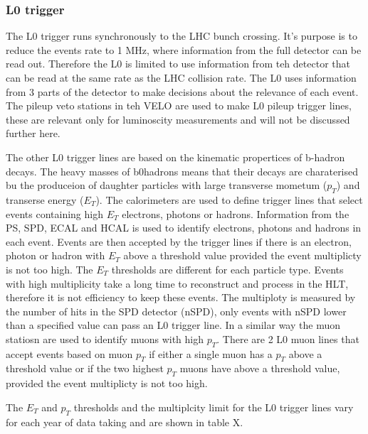 \subsubsection{L0 trigger}
\label{L0}


The L0 trigger runs synchronously to the LHC bunch crossing. It's purpose is to reduce the events rate to 1 MHz, where information from the full detector can be read out. Therefore the L0 is limited to use information from teh detector that can be read at the same rate as the LHC collision rate.
The L0 uses information from 3 parts of the detector to make decisions about the relevance of each event. The pileup veto stations in teh VELO are used to make L0 pileup trigger lines, these are relevant only for luminoscity measurements and will not be discussed further here.

The other L0 trigger lines are based on the kinematic propertices of b-hadron decays. The heavy masses of b0hadrons means that their decays are charaterised bu the produceion of daughter particles with large transverse mometum ($p_{T}$) and transerse energy ($E_{T}$).
The calorimeters are used to define trigger lines that select events containing high $E_{T}$ electrons, photons or hadrons. Information from the PS, SPD, ECAL and HCAL is used to identify electrons, photons and hadrons in each event. Events are then accepted by the trigger lines if there is an  electron, photon or hadron with $E_{T}$ above a threshold value provided the event multiplicty is not too high. The $E_{T}$ thresholds are different for each particle type. Events with high multiplicity take a long time to reconstruct and process in the HLT, therefore it is not efficiency to keep these events. The multiploty is measured by the number of hits in the SPD detector (nSPD), only events with nSPD lower than a specified value can pass an L0 trigger line. 
In a similar way the muon statiosn are used to identify muons with high $p_{T}$. There are 2 L0 muon lines that accept events based on muon $p_{T}$ if either a single muon has a $p_{T}$  above a threshold value or if the two highest $p_{T}$  muons have above a threshold value, provided the event multiplicty is not too high. %

The  $E_{T}$ and $p_{T}$ thresholds and the multiplcity limit for the L0 trigger lines vary for each year of data taking and are shown in table X. 


